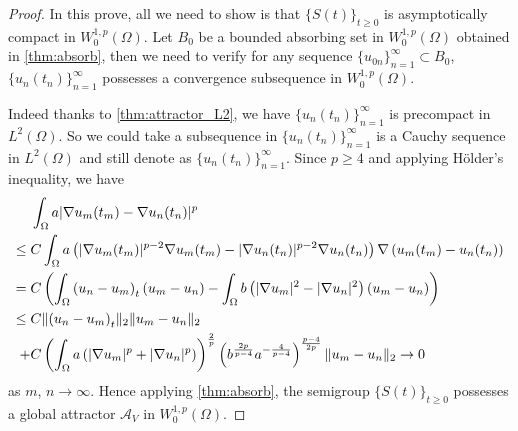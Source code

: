 \documentclass[11pt]{amsart}
\theoremstyle{definition}
\numberwithin{equation}{section}
\newcommand*\abs[1]{\lvert#1\rvert}
\newcommand*\norm[1]{\lVert#1\rVert}
\newcommand*\Brace[1]{\lbrace#1\rbrace}
\begin{document}
\begin{proof}
	In this prove, all we need to show is that $\Brace{S(t)}_{t \geq 0}$ is
	asymptotically compact in $W_0^{1,p}(\Omega)$.
	Let $B_0$ be a bounded absorbing set in $W_0^{1,p}(\Omega)$ obtained in
	\cref{thm:absorb}, then we need to verify for any sequence
	$\Brace{u_{0n}}_{n=1}^{\infty} \subset B_0$, $\Brace{u_n(t_n)}_{n=1}^{\infty}$
	possesses a convergence subsequence in $W_0^{1,p}(\Omega)$.

	Indeed thanks to \cref{thm:attractor_L2}, we have
	$\Brace{u_n(t_n)}_{n=1}^{\infty}$ is precompact in $L^2(\Omega)$.
	So we could take a subsequence in $\Brace{u_n(t_n)}_{n=1}^{\infty}$ is a
	Cauchy sequence in $L^2(\Omega)$
	and still denote as $\Brace{u_n(t_n)}_{n=1}^{\infty}$. Since $p \geq 4$ and
	applying H\"older's inequality, we have
	\begin{equation*}
		\begin{split}
			& \int_{\Omega}a\abs{\nabla u_m(t_m) - \nabla u_n(t_n)}^p\\
			\leq{} & C\int_{\Omega}a
			\left(\abs{\nabla u_m(t_m)}^{p-2}\nabla u_m(t_m)
			- \abs{\nabla u_n(t_n)}^{p-2}\nabla u_n(t_n)\right)
			\*\nabla\left(u_m(t_m) - u_n(t_n)\right)\\
			={} & C\left(\int_{\Omega}\left(u_n-u_m\right)_t\left(u_m-u_n\right)
			- \int_{\Omega}b\left(\abs{\nabla u_m}^2 - \abs{\nabla u_n}^2\right)
			\left(u_m - u_n\right)\right)\\
			\leq{} & C\norm{\left(u_n-u_m\right)_t}_2\norm{u_m-u_n}_2\\
			+{} & C\left(\int_{\Omega}a\left(\abs{\nabla u_m}^p
			+ \abs{\nabla u_n}^p\right)\right)^{\frac{2}{p}}
			\left(b^{\frac{2p}{p-4}}a^{-\frac{4}{p-4}}\right)^{\frac{p-4}{2p}}
			\norm{u_m-u_n}_2 \to 0
		\end{split}
	\end{equation*}
	as $m$, $n \to \infty$. Hence applying \cref{thm:absorb}, the semigroup $\Brace{S(t)}_{t \geq 0}$
	possesses a global attractor $\mathcal{A}_V$ in $W_0^{1,p}(\Omega)$.
\end{proof}
% 
\printbibliography
\end{document}

